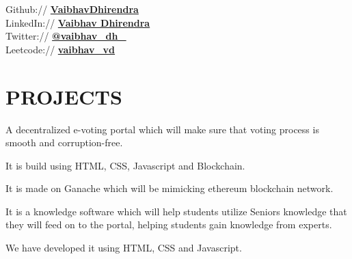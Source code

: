 \documentclass[]{deedy-resume-openfont}
\begin{document}
\begin{minipage}[t]{0.33\textwidth}
Github:// \href{https://github.com/VaibhavDhirendra}{\bf VaibhavDhirendra} \\
LinkedIn://  \href{https://www.linkedin.com/in/vaibhav-dhirendra}{\bf Vaibhav Dhirendra} \\
Twitter://  \href{https://twitter.com/Vaibhav_dh_}{\bf @vaibhav\_dh\_} \\
Leetcode:// \href{https://leetcode.com/vaibhav_vd/}{\bf vaibhav_vd}


%
%

\end{minipage} 
\hfill
\begin{minipage}[t]{0.66\textwidth} 
\vspace{\topsep} %
\begin{tightemize}


\end{tightemize}
\sectionsep
\section{PROJECTS}
\vspace{\topsep}
\vspace{\topsep} %
\begin{tightemize}
\item A decentralized e-voting portal which will make sure that voting process is smooth and corruption-free. 
\item It is build using HTML, CSS, Javascript and Blockchain.
\item It is made on Ganache which will be mimicking ethereum blockchain network.
\end{tightemize}

\sectionsep

\vspace{\topsep}
\begin{tightemize}
\item It is a knowledge software which will help students utilize Seniors knowledge that they will feed on to the portal, helping students gain knowledge from experts.
\item We have developed it using HTML, CSS and Javascript.
\end{tightemize}
\vspace{\topsep}
\vspace{\topsep} %


\end{minipage}
\end{document}
